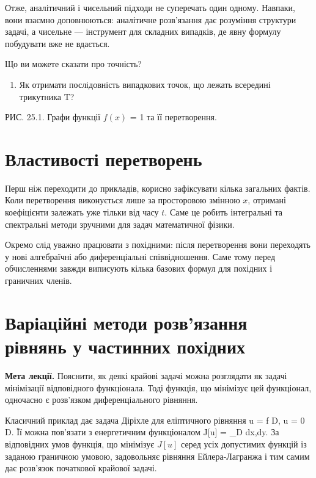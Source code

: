 \documentclass[
  ukrainian,
]{article}
\providecommand{\tightlist}{%
  \setlength{\itemsep}{0pt}\setlength{\parskip}{0pt}}
\begin{document}
Отже, аналітичний і чисельний підходи не суперечать один одному.
Навпаки, вони взаємно доповнюються: аналітичне розв'язання дає розуміння
структури задачі, а чисельне --- інструмент для складних випадків, де
явну формулу побудувати вже не вдається.

Що ви можете сказати про точність?

\begin{enumerate}
\def\labelenumi{\arabic{enumi}.}
\setcounter{enumi}{3}
\tightlist
\item
  Як отримати послідовність випадкових точок, що лежать всередині
  трикутника T?
\end{enumerate}

РИС. 25.1. Графи функції \(f(x)\) = 1 та її перетворення.

\section{Властивості
перетворень}\label{ux432ux43bux430ux441ux442ux438ux432ux43eux441ux442ux456-ux43fux435ux440ux435ux442ux432ux43eux440ux435ux43dux44c}

Перш ніж переходити до прикладів, корисно зафіксувати кілька загальних
фактів. Коли перетворення виконується лише за просторовою змінною \(x\),
отримані коефіцієнти залежать уже тільки від часу \(t\). Саме це робить
інтегральні та спектральні методи зручними для задач математичної
фізики.

Окремо слід уважно працювати з похідними: після перетворення вони
переходять у нові алгебраїчні або диференціальні співвідношення. Саме
тому перед обчисленнями завжди виписують кілька базових формул для
похідних і граничних членів.

\section{Варіаційні методи розв'язання рівнянь у частинних
похідних}\label{ux432ux430ux440ux456ux430ux446ux456ux439ux43dux456-ux43cux435ux442ux43eux434ux438-ux440ux43eux437ux432ux44fux437ux430ux43dux43dux44f-ux440ux456ux432ux43dux44fux43dux44c-ux443-ux447ux430ux441ux442ux438ux43dux43dux438ux445-ux43fux43eux445ux456ux434ux43dux438ux445}

\textbf{Мета лекції.} Пояснити, як деякі крайові задачі можна розглядати
як задачі мінімізації відповідного функціонала. Тоді функція, що
мінімізує цей функціонал, одночасно є розв'язком диференціального
рівняння.

Класичний приклад дає задача Діріхле для еліптичного рівняння \Delta u =
f \quad {} D, \qquad u = 0 \quad {}
\partial D. Її можна пов'язати з енергетичним функціоналом J{[}u{]} =
\iint\_D
 dx,dy. За
відповідних умов функція, що мінімізує \(J[u]\) серед усіх допустимих
функцій із заданою граничною умовою, задовольняє рівняння
Ейлера-Лагранжа і тим самим дає розв'язок початкової крайової задачі.
\end{document}
